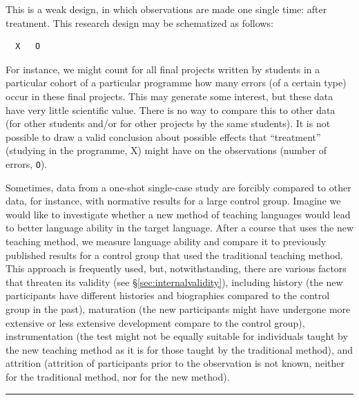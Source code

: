 \documentclass[
]{book}
\begin{document}
This is a weak design, in which observations are made one single time: after treatment. This research design may be schematized as follows:

\begin{verbatim}
  X   O
\end{verbatim}

For instance, we might count for all final projects written by students in a particular cohort of a particular programme how many errors (of a certain type) occur in these final projects. This may generate some interest, but these data have very little scientific value. There is no way to compare this to other data (for other students and/or for other projects by the same students). It is not possible to draw a valid conclusion about possible effects that ``treatment'' (studying in the programme, X) might have on the observations (number of errors, \texttt{O}).

Sometimes, data from a one-shot single-case study are forcibly compared to other data, for instance, with normative results for a large control group. Imagine we would like to investigate whether a new method of teaching languages would lead to better language ability in the target language. After a course that uses the new teaching method, we measure language ability and compare it to previously published results for a control group that used the traditional teaching method. This approach is frequently used, but, notwithstanding, there are various factors that threaten its validity (see §\ref{sec:internalvalidity}), including history (the new participants have different histories and biographies compared to the control group in the past), maturation (the new participants might have undergone more extensive or less extensive development compare to the control group), instrumentation (the test might not be equally suitable for individuals taught by the new teaching method as it is for those taught by the traditional method), and attrition (attrition of participants prior to the observation is not known, neither for the traditional method, nor for the new method).

\begin{center}\rule{0.5\linewidth}{0.5pt}\end{center}
\end{document}
